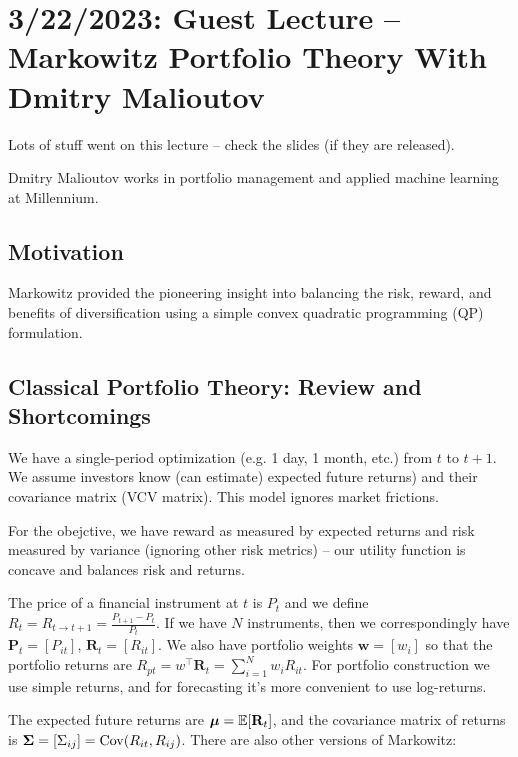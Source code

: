 \chapter{3/22/2023: Guest Lecture -- Markowitz Portfolio Theory With Dmitry Malioutov}
Lots of stuff went on this lecture -- check the slides (if they are released).

\iffalse
Dmitry Malioutov works in portfolio management and applied machine learning at Millennium.

\section{Motivation}
Markowitz provided the pioneering insight into balancing the risk, reward, and benefits of diversification using a simple convex quadratic programming (QP) formulation.

\section{Classical Portfolio Theory: Review and Shortcomings}
We have a single-period optimization (e.g. 1 day, 1 month, etc.) from $t$ to $t+1$. We assume investors know (can estimate) expected future returns) and their covariance matrix (VCV matrix). This model ignores market frictions.

For the obejctive, we have reward as measured by expected returns and risk measured by variance (ignoring other risk metrics) -- our utility function is concave and balances risk and returns.

The price of a financial instrument at $t$ is $P_t$ and we define $R_t = R_{t\to t+1} = \frac{P_{t+1}-P_t}{P_t}$. If we have $N$ instruments, then we correspondingly have $\mathbf P_t = [P_{it}]$, $\mathbf R_t = [R_{it}]$. We also have portfolio weights $\mathbf w=[w_i]$ so that the portfolio returns are $R_{pt} = w^\top\mathbf R_t = \sum_{i=1}^N w_iR_{it}$. For portfolio construction we use simple returns, and for forecasting it's more convenient to use log-returns.

The expected future returns are $\boldsymbol{\mu}=\mathbb E[\mathbf R_t]$, and the covariance matrix of returns is $\boldsymbol{\Sigma} = [\Sigma_{ij}] = \operatorname{Cov}(R_{it},R_{ij})$. 
 There are also other versions of Markowitz:

